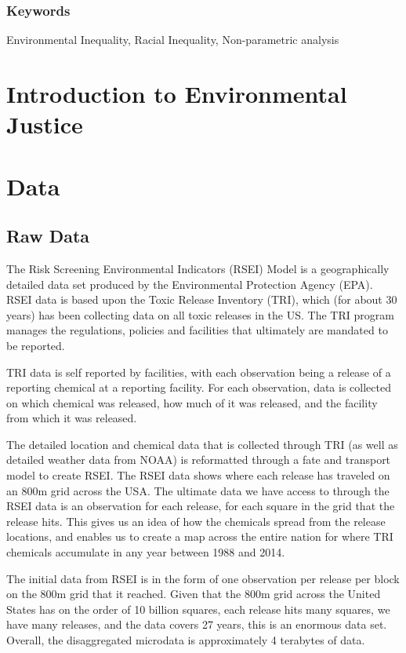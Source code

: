 \documentclass[12pt,twoside]{dukestatscithesis}
\theoremstyle{definition}
\theoremstyle{definition}
\theoremstyle{definition}
\theoremstyle{remark}
\begin{document}
\subsection{Keywords}\label{keywords}

Environmental Inequality, Racial Inequality, Non-parametric analysis

\chapter{Introduction to Environmental Justice}\label{rmd-basics}

\chapter{Data}\label{math}

\section{Raw Data}\label{raw-data}

The Risk Screening Environmental Indicators (RSEI) Model is a
geographically detailed data set produced by the Environmental
Protection Agency (EPA). RSEI data is based upon the Toxic Release
Inventory (TRI), which (for about 30 years) has been collecting data on
all toxic releases in the US. The TRI program manages the regulations,
policies and facilities that ultimately are mandated to be reported.

TRI data is self reported by facilities, with each observation being a
release of a reporting chemical at a reporting facility. For each
observation, data is collected on which chemical was released, how much
of it was released, and the facility from which it was released.

The detailed location and chemical data that is collected through TRI
(as well as detailed weather data from NOAA) is reformatted through a
fate and transport model to create RSEI. The RSEI data shows where each
release has traveled on an 800m grid across the USA. The ultimate data
we have access to through the RSEI data is an observation for each
release, for each square in the grid that the release hits. This gives
us an idea of how the chemicals spread from the release locations, and
enables us to create a map across the entire nation for where TRI
chemicals accumulate in any year between 1988 and 2014.

The initial data from RSEI is in the form of one observation per release
per block on the 800m grid that it reached. Given that the 800m grid
across the United States has on the order of 10 billion squares, each
release hits many squares, we have many releases, and the data covers 27
years, this is an enormous data set. Overall, the disaggregated
microdata is approximately 4 terabytes of data.
\end{document}
